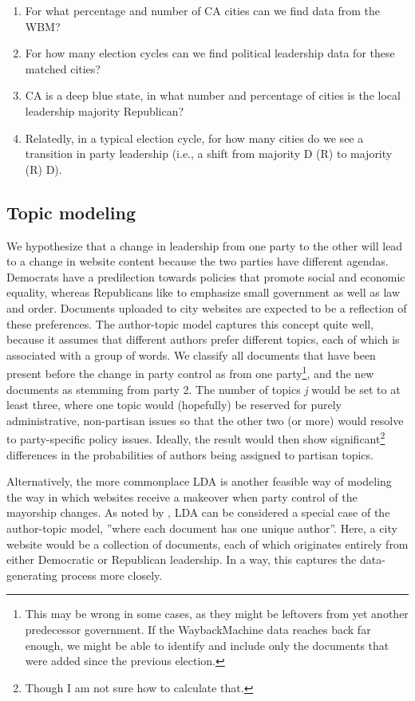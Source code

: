\documentclass[11pt]{article}
\begin{document}
\begin{enumerate}

\item For what percentage and number of CA cities can we find data from the WBM?
\item For how many election cycles can we find political leadership data for these matched cities?
\item CA is a deep blue state, in what number and percentage of cities is the local leadership majority Republican? 
\item Relatedly, in a typical election cycle, for how many cities do we see a transition in party leadership (i.e., a shift from majority D (R) to majority (R) D). 

\end{enumerate}

\subsection{Topic modeling}
We hypothesize that a change in leadership from one party to the other will lead to a change in website content because the two parties have different agendas. Democrats have a predilection towards policies that promote social and economic equality, whereas Republicans like to emphasize small government as well as law and order. Documents uploaded to city websites are expected to be a reflection of these preferences. The author-topic model \citep{Rosen-Zvi2004} captures this concept quite well, because it assumes that different authors prefer different topics, each of which is associated with a group of words. We classify all documents that have been present before the change in party control as from one party\footnote{This may be wrong in some cases, as they might be leftovers from yet another predecessor government. If the WaybackMachine data reaches back far enough, we might be able to identify and include only the documents that were added since the previous election.}, and the new documents as stemming from party 2. The number of topics \textit{j} would be set to at least three, where one topic would (hopefully) be reserved for purely administrative, non-partisan issues so that the other two (or more) would resolve to party-specific policy issues. Ideally, the result would then show significant\footnote{Though I am not sure how to calculate that.} differences in the probabilities of authors being assigned to partisan topics.

Alternatively, the more commonplace LDA is another feasible way of modeling the way in which websites receive a makeover when party control of the mayorship changes. As noted by \citep{Rosen-Zvi2004}, LDA can be considered a special case of the author-topic model, ''where each document has one unique author''. Here, a city website would be a collection of documents, each of which originates entirely from either Democratic or Republican leadership. In a way, this captures the data-generating process more closely.
\end{document}
